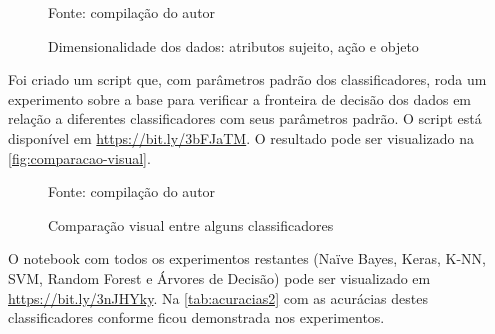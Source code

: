 \begin{figure}[H]
	\centering
	\caption{Dimensionalidade dos dados: atributos sujeito, ação e objeto}
	
	\label{fig:dimensionalidade}
	{\scriptsize Fonte: compilação do autor}
\end{figure}


Foi criado um script que, com parâmetros padrão dos classificadores, roda um experimento sobre a base para verificar a fronteira de decisão dos dados em relação a diferentes classificadores com seus parâmetros padrão. O script está disponível em \url{https://bit.ly/3bFJaTM}. O resultado pode ser visualizado na \autoref{fig:comparacao-visual}.

\begin{figure}[H]
	\centering
	\caption{Comparação visual entre alguns classificadores}
	
	\label{fig:comparacao-visual}
	{\scriptsize Fonte: compilação do autor}
\end{figure}

O notebook com todos os experimentos restantes (Naïve Bayes, Keras, K-NN, SVM, Random Forest e Árvores de Decisão) pode ser visualizado em \url{https://bit.ly/3nJHYky}. Na \autoref{tab:acuracias2} com as acurácias destes classificadores conforme ficou demonstrada nos experimentos.

